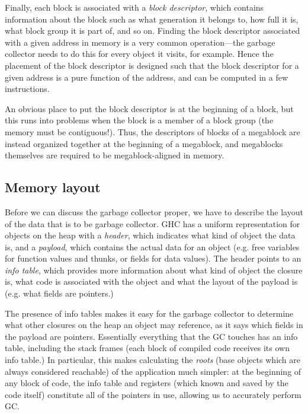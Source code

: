 Finally, each block is associated with a \emph{block descriptor}, which
contains information about the block such as what generation it belongs to, how full it is, what block
group it is part of, and so on.  Finding the block descriptor
associated with a given address in memory is a very common
operation---the garbage collector needs to do this for every object it
visits, for example.  Hence the placement of the block descriptor is
designed such that the block descriptor for a given address is a pure function
of the address, and can be computed in a few instructions.

An obvious place to put the block descriptor is at the beginning of a
block, but this runs into problems when the block is a member of a
block group (the memory must be contiguous!).  Thus, the descriptors
of blocks of a megablock are instead organized together at the
beginning of a megablock, and megablocks themselves are required to be
megablock-aligned in memory.

\subsection{Memory layout}

Before we can discuss the garbage collector proper, we have to describe
the layout of the data that is to be garbage collector.  GHC has a uniform
representation for objects on the heap with a \emph{header}, which indicates
what kind of object the data is, and a \emph{payload}, which contains
the actual data for an object (e.g. free variables for function values
and thunks, or fields for data values).  The header points to an
\emph{info table}, which provides more information about what kind of
object the closure is, what code is associated with the object and what
the layout of the payload is (e.g. what fields are pointers.)

The presence of info tables makes it easy for the garbage collector to
determine what other closures on the heap an object may reference, as it
says which fields in the payload are pointers.  Essentially everything
that the GC touches has an info table, including the stack frames (each
block of compiled code receives its own info table.)  In particular,
this makes calculating the \emph{roots} (base objects which are always
considered reachable) of the application much simpler: at the beginning
of any block of code, the info table and registers (which known and
saved by the code itself) constitute all of the pointers in use,
allowing us to accurately perform GC.

